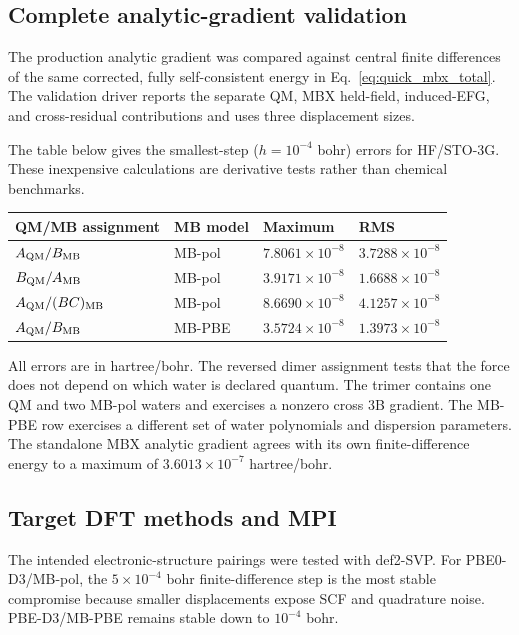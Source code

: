 \documentclass[11pt]{article}
\begin{document}
\subsection{Complete analytic-gradient validation}

The production analytic gradient was compared against central finite
differences of the same corrected, fully self-consistent energy in
Eq.~\ref{eq:quick_mbx_total}. The validation driver reports the separate
QM, MBX held-field, induced-EFG, and cross-residual contributions and uses
three displacement sizes.

The table below gives the smallest-step ($h=10^{-4}$ bohr) errors for
HF/STO-3G. These inexpensive calculations are derivative tests rather
than chemical benchmarks.

\begin{center}
\small
\begin{tabular}{llll}
\toprule
QM/MB assignment & MB model & Maximum & RMS \\
\midrule
$A_{\rm QM}/B_{\rm MB}$ & MB-pol &
$7.8061\times10^{-8}$ & $3.7288\times10^{-8}$ \\
$B_{\rm QM}/A_{\rm MB}$ & MB-pol &
$3.9171\times10^{-8}$ & $1.6688\times10^{-8}$ \\
$A_{\rm QM}/(BC)_{\rm MB}$ & MB-pol &
$8.6690\times10^{-8}$ & $4.1257\times10^{-8}$ \\
$A_{\rm QM}/B_{\rm MB}$ & MB-PBE &
$3.5724\times10^{-8}$ & $1.3973\times10^{-8}$ \\
\bottomrule
\end{tabular}
\end{center}

All errors are in hartree/bohr. The reversed dimer assignment tests that
the force does not depend on which water is declared quantum. The trimer
contains one QM and two MB-pol waters and exercises a nonzero cross 3B
gradient. The MB-PBE row exercises a different set of water polynomials
and dispersion parameters. The standalone MBX analytic gradient agrees
with its own finite-difference energy to a maximum of
$3.6013\times10^{-7}$ hartree/bohr.

\subsection{Target DFT methods and MPI}

The intended electronic-structure pairings were tested with def2-SVP.
For PBE0-D3/MB-pol, the $5\times10^{-4}$ bohr finite-difference step is
the most stable compromise because smaller displacements expose SCF and
quadrature noise. PBE-D3/MB-PBE remains stable down to $10^{-4}$ bohr.
\end{document}
